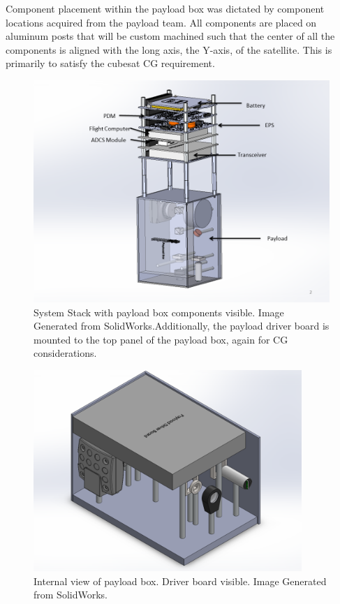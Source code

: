 \documentclass[12pt]{article}
\begin{document}
Component placement within the payload box was dictated by component locations acquired from the payload team. All components are placed on aluminum posts that will be custom machined such that the center of all the components is aligned with the long axis, the Y-axis, of the satellite. This is primarily to satisfy the cubesat CG requirement.

\begin{figure}[!ht]
\centering
\includegraphics[width=6in]{images/STR-9.png}
\caption{System Stack with payload box components visible. Image Generated from SolidWorks.Additionally, the payload driver board is mounted to the top panel of the payload box, again for CG considerations.}
\label{fig:str-9}
\end{figure}

\begin{figure}[!ht]
\centering
\includegraphics[width=4in]{images/STR-10.png}
\caption{Internal view of payload box. Driver board visible. Image Generated from SolidWorks.}
\label{fig:str-10}
\end{figure}
\end{document}
